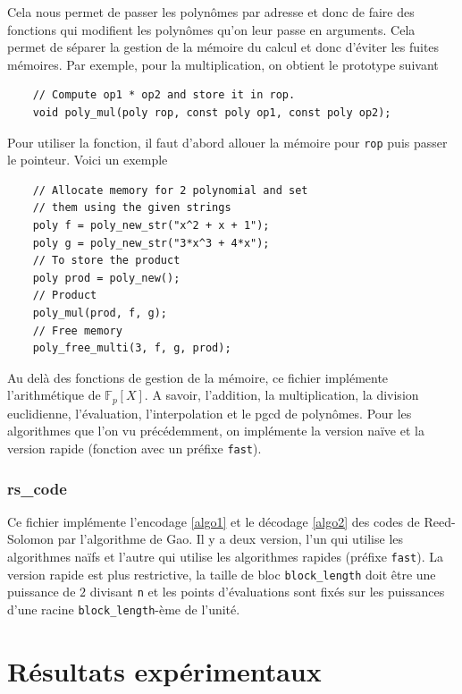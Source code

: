 \documentclass{article}
\theoremstyle{definition}
\theoremstyle{remark}
\begin{document}
Cela nous permet de passer les polynômes par adresse et donc de faire des fonctions qui modifient les polynômes qu'on leur passe en arguments. Cela permet de séparer la gestion de la mémoire du calcul et donc d'éviter les fuites mémoires. Par exemple, pour la multiplication, on obtient le prototype suivant

\begin{verbatim}
    // Compute op1 * op2 and store it in rop.
    void poly_mul(poly rop, const poly op1, const poly op2);
\end{verbatim}

Pour utiliser la fonction, il faut d'abord allouer la mémoire pour \verb|rop| puis passer le pointeur. Voici un exemple

\begin{verbatim}
    // Allocate memory for 2 polynomial and set 
    // them using the given strings
    poly f = poly_new_str("x^2 + x + 1");
    poly g = poly_new_str("3*x^3 + 4*x");
    // To store the product
    poly prod = poly_new();
    // Product
    poly_mul(prod, f, g);
    // Free memory
    poly_free_multi(3, f, g, prod);
\end{verbatim}

Au delà des fonctions de gestion de la mémoire, ce fichier implémente l'arithmétique de $\mathbb{F}_p[X]$. A savoir, l'addition, la multiplication, la division euclidienne, l'évaluation, l'interpolation et le pgcd de polynômes. Pour les algorithmes que l'on vu précédemment, on implémente la version naïve et la version rapide (fonction avec un préfixe \verb|fast|).

\subsubsection{rs\_code}

Ce fichier implémente l'encodage \ref{algo1} et le décodage \ref{algo2} des codes de Reed-Solomon par l'algorithme de Gao. Il y a deux version, l'un qui utilise les algorithmes naïfs et l'autre qui utilise les algorithmes rapides (préfixe \verb|fast|). La version rapide est plus restrictive, la taille de bloc  \verb|block_length| doit être une puissance de $2$ divisant \verb|n| et les points d'évaluations sont fixés sur les puissances d'une racine \verb|block_length|-ème de l'unité.

\section{Résultats expérimentaux}
\label{sec:res}
\end{document}
